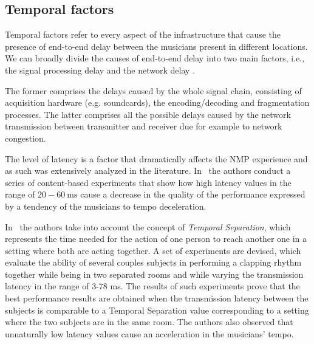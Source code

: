 \documentclass[conference]{IEEEtran}
\begin{document}
\subsection{Temporal factors}\label{subsec:temporal}
Temporal factors refer to every aspect of the infrastructure that cause the presence of end-to-end delay between the musicians present in different locations. We can broadly divide the causes of end-to-end delay into two main factors, i.e., the signal processing delay and the network delay \cite{Lakiotakis}. 

The former comprises the delays caused by the whole signal chain, consisting of acquisition hardware (e.g. soundcards), the encoding/decoding and fragmentation processes. The latter comprises all the possible delays caused by the network transmission between transmitter and receiver due for example to network congestion.

The level of latency is a factor that dramatically affects the NMP experience and as such was extensively analyzed in the literature. In~\cite{RottondiFeature} the authors conduct a series of content-based experiments that show how high latency values in the range of $20-60~\mathrm{ms}$ cause a decrease in the quality of the performance expressed by a tendency of the musicians to tempo deceleration. 

In~\cite{Chafe1,Chafe2,Chafe3} the authors take into account the concept of \textit{Temporal Separation}, which represents the time needed for the action of one person to reach another one in a setting where both are acting together. A set of experiments are devised, which evaluate the ability of several couples subjects in performing a clapping rhythm together while being in two separated rooms and while varying the transmission latency in the range of 3-78 ms. The results of such experiments prove that the best performance results are obtained when the transmission latency between the subjects is comparable to a Temporal Separation value corresponding to a setting where the two subjects are in the same room. The authors also observed that unnaturally low latency values cause an acceleration in the musicians' tempo.
\end{document}
